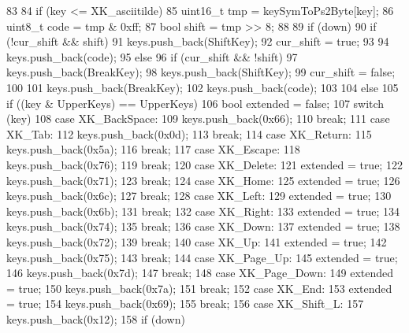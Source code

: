 \begin{DoxyCode}
83 {
84     if (key <= XK_asciitilde) {
85         uint16_t tmp = keySymToPs2Byte[key];
86         uint8_t code = tmp & 0xff;
87         bool shift = tmp >> 8;
88 
89         if (down) {
90             if (!cur_shift && shift) {
91                 keys.push_back(ShiftKey);
92                 cur_shift = true;
93             }
94             keys.push_back(code);
95         } else {
96             if (cur_shift && !shift) {
97                 keys.push_back(BreakKey);
98                 keys.push_back(ShiftKey);
99                 cur_shift = false;
100             }
101             keys.push_back(BreakKey);
102             keys.push_back(code);
103         }
104     } else {
105         if ((key & UpperKeys) == UpperKeys) {
106             bool extended = false;
107             switch (key) {
108               case XK_BackSpace:
109                 keys.push_back(0x66);
110                 break;
111               case XK_Tab:
112                 keys.push_back(0x0d);
113                 break;
114               case XK_Return:
115                 keys.push_back(0x5a);
116                 break;
117              case XK_Escape:
118                 keys.push_back(0x76);
119                 break;
120              case XK_Delete:
121                 extended = true;
122                 keys.push_back(0x71);
123                 break;
124              case XK_Home:
125                 extended = true;
126                 keys.push_back(0x6c);
127                 break;
128              case XK_Left:
129                 extended = true;
130                 keys.push_back(0x6b);
131                 break;
132              case XK_Right:
133                 extended = true;
134                 keys.push_back(0x74);
135                 break;
136              case XK_Down:
137                 extended = true;
138                 keys.push_back(0x72);
139                 break;
140              case XK_Up:
141                 extended = true;
142                 keys.push_back(0x75);
143                 break;
144              case XK_Page_Up:
145                 extended = true;
146                 keys.push_back(0x7d);
147                 break;
148              case XK_Page_Down:
149                 extended = true;
150                 keys.push_back(0x7a);
151                 break;
152              case XK_End:
153                 extended = true;
154                 keys.push_back(0x69);
155                 break;
156              case XK_Shift_L:
157                 keys.push_back(0x12);
158                 if (down)
}}}}
\end{DoxyCode}
